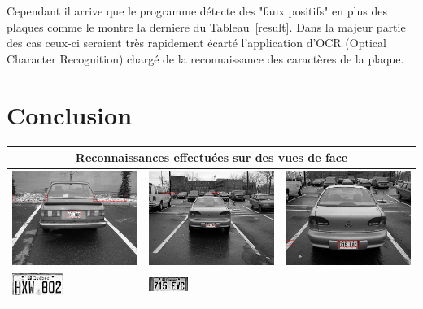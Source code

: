 \documentclass[a4paper,10pt,twocolumn]{article}
\begin{document}
Cependant il arrive que le programme détecte des "faux positifs" en plus des plaques comme le montre la derniere du Tableau~\ref{result}. Dans la majeur partie des cas ceux-ci seraient très rapidement écarté l'application d'OCR (Optical Character Recognition) chargé de la reconnaissance des caractères de la plaque.

\section{Conclusion}

\begin{table}[ht]
  \centering
  \begin{tabular}{|m{150pt}|m{150pt}|m{150pt}|}
    \hline
    \multicolumn{3}{|c|}{Reconnaissances effectuées sur des vues de face}\\
    \hline
	  \includegraphics[width=150pt]{img/plate_detect_0.png}&
	  \includegraphics[width=150pt]{img/plate_detect_1.png}&
	  \includegraphics[width=150pt]{img/plate_detect_2.png}\tabularnewline
	  \includegraphics[scale=1]{img/plate_0.png}&
	  \includegraphics[scale=1]{img/plate_1.png}&

\end{tabular}
\end{table}
\end{document}
